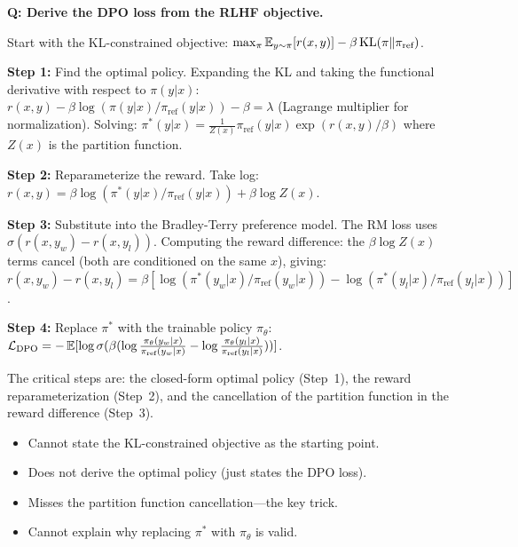 \begin{interviewq}
\textbf{Q: Derive the DPO loss from the RLHF objective.}

 \quad {} \quad
\badgefreq{\freqmed}

\stronganswer
Start with the KL-constrained objective:
$\max_\pi \operatorname{\mathbb{E}}_{y \sim \pi}[r(x,y)] - \beta \operatorname{KL}(\pi \| \pi_{\text{ref}})$.

\textbf{Step 1:} Find the optimal policy.  Expanding the KL and taking the
functional derivative with respect to $\pi(y|x)$:
$r(x,y) - \beta \log(\pi(y|x)/\pi_{\text{ref}}(y|x)) - \beta = \lambda$
(Lagrange multiplier for normalization).  Solving:
$\pi^*(y|x) = \frac{1}{Z(x)} \pi_{\text{ref}}(y|x) \exp(r(x,y)/\beta)$
where $Z(x)$ is the partition function.

\textbf{Step 2:} Reparameterize the reward.  Take log:
$r(x,y) = \beta \log(\pi^*(y|x)/\pi_{\text{ref}}(y|x)) + \beta \log Z(x)$.

\textbf{Step 3:} Substitute into the Bradley-Terry preference model.  The
RM loss uses $\sigma(r(x,y_w) - r(x,y_l))$.  Computing the reward
difference: the $\beta \log Z(x)$ terms cancel (both are conditioned on
the same $x$), giving:
$r(x,y_w) - r(x,y_l) = \beta[\log(\pi^*(y_w|x)/\pi_{\text{ref}}(y_w|x)) -
\log(\pi^*(y_l|x)/\pi_{\text{ref}}(y_l|x))]$.

\textbf{Step 4:} Replace $\pi^*$ with the trainable policy $\pi_\theta$:
$\mathcal{L}_{\text{DPO}} = -\operatorname{\mathbb{E}}[\log \sigma(\beta(\log \frac{\pi_\theta(y_w|x)}{\pi_{\text{ref}}(y_w|x)} - \log \frac{\pi_\theta(y_l|x)}{\pi_{\text{ref}}(y_l|x)}))]$.

The critical steps are: the closed-form optimal policy (Step~1), the
reward reparameterization (Step~2), and the cancellation of the partition
function in the reward difference (Step~3).

\redflags
\begin{itemize}
\item Cannot state the KL-constrained objective as the starting point.
\item Does not derive the optimal policy (just states the DPO loss).
\item Misses the partition function cancellation---the key trick.
\item Cannot explain why replacing $\pi^*$ with $\pi_\theta$ is valid.
\end{itemize}



\end{interviewq}
